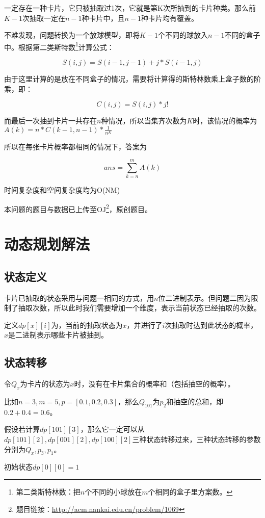 \documentclass[master]{thesis-uestc}
\begin{document}
一定存在一种卡片，它只被抽取过1次，它就是第K次所抽到的卡片种类。那么前$K-1$次抽取一定在$n-1$种卡片中，且$n-1$种卡片均有覆盖。

不难发现，问题转换为一个放球模型，即将$K-1$个不同的球放入$n-1$不同的盒子中。根据第二类斯特数\footnote{第二类斯特林数：把$n$个不同的小球放在$m$个相同的盒子里方案数。}计算公式： 

$$
S(i,j)=S(i-1,j-1)+j*S(i-1,j)
$$

由于这里计算的是放在不同盒子的情况，需要将计算得的斯特林数乘上盒子数的阶乘，即：

$$
C(i,j)=S(i,j)*j!
$$

而最后一次抽到卡片一共存在$n$种情况，所以当集齐次数为$K$时，该情况的概率为$A(k)=n*C(k-1,n-1)*{\frac{1}{n^K}}$

所以在每张卡片概率都相同的情况下，答案为

$$
ans=\sum\limits_{k=n}^m{A(k)}
$$

时间复杂度和空间复杂度均为O(NM)

本问题的题目与数据已上传至OJ\footnote{题目链接：\url{http://acm.nankai.edu.cn/problem/1069} }，原创题目。

\section{动态规划解法}

\subsection{状态定义}

卡片已抽取的状态采用与问题一相同的方式，用$n$位二进制表示。但问题二因为限制了抽取次数，所以此时我们需要增加一个维度，表示当前状态已经抽取的次数。

定义$dp[x][i]$为，当前的抽取状态为$x$，并进行了$i$次抽取时达到此状态的概率，$x$是二进制表示哪些卡片被抽到。

\subsection{状态转移}

令$Q_x$为卡片的状态为$x$时，没有在卡片集合的概率和（包括抽空的概率）。

比如$n=3,m=5,p=[0.1,0.2,0.3]$，那么$Q_{101}$为$p_2$和抽空的总和，即$0.2+0.4=0.6$。

假设若计算$dp[101][3]$，那么它一定可以从$dp[101][2],dp[001][2],dp[100][2]$三种状态转移过来，三种状态转移的参数分别为$Q_x,p_3,p_1$。

初始状态$dp[0][0]=1$
\end{document}
